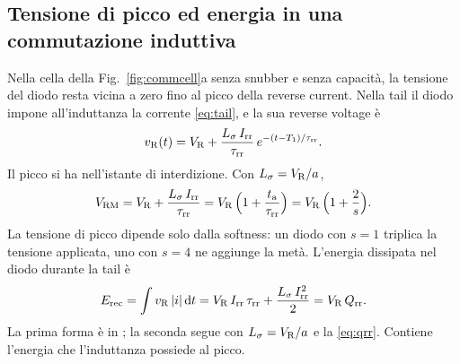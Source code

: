 \documentclass[10pt,a4paper]{scrartcl}
\let\newcommand\pdvaluedefine
\newcommand{\VR}{V_\mathrm{R}}
\newcommand{\Irr}{I_\mathrm{rr}}
\newcommand{\Qrr}{Q_\mathrm{rr}}
\newcommand{\ta}{t_\mathrm{a}}
\newcommand{\taurr}{\tau_\mathrm{rr}}
\newcommand{\Tone}{T_1}
\newcommand{\Vrm}{V_\mathrm{RM}}
\newcommand{\diff}{\mathrm{d}}
\newcommand{\Ls}{L_\sigma}                    %
\newcommand{\Erec}{E_\mathrm{rec}}
\begin{document}
\subsection{Tensione di picco ed energia in una commutazione induttiva}
\label{sec:energy}
Nella cella della Fig.~\ref{fig:commcell}a senza snubber e senza capacità, la tensione del diodo resta vicina a zero fino al picco della reverse current. Nella tail il diodo impone all'induttanza la corrente \eqref{eq:tail}, e la sua reverse voltage è
\begin{equation}
v_\mathrm{R}(t) = \VR + \frac{\Ls\,\Irr}{\taurr}\,e^{-(t-\Tone)/\taurr} .
\end{equation}
Il picco si ha nell'istante di interdizione. Con $\Ls = \VR/a$,
\begin{equation}
\Vrm = \VR + \frac{\Ls\,\Irr}{\taurr} = \VR\,\Bigl(1 + \frac{\ta}{\taurr}\Bigr) = \VR\,\Bigl(1 + \frac{2}{s}\Bigr) .
\label{eq:vrm}
\end{equation}
La tensione di picco dipende solo dalla softness: un diodo con $s = 1$ triplica la tensione applicata, uno con $s = 4$ ne aggiunge la metà. L'energia dissipata nel diodo durante la tail è
\begin{equation}
\Erec = \int v_\mathrm{R}\,|i|\,\diff t = \VR\,\Irr\,\taurr + \frac{\Ls\,\Irr^2}{2} = \VR\,\Qrr .
\label{eq:erec}
\end{equation}
La prima forma è in \cite{mathworks}; la seconda segue con $\Ls = \VR/a$ e la \eqref{eq:qrr}. Contiene l'energia che l'induttanza possiede al picco.
\end{document}
